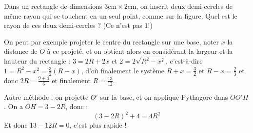
\begin{exo}
Dans un rectangle de dimensions $3\mathrm{cm}\times 2\mathrm{cm}$, on inscrit deux demi-cercles de même rayon qui se touchent en un seul point, comme sur la figure.
Quel est le rayon de ces deux demi-cercles ? (Ce n'est pas $1$!)
\begin{center}
\end{center}
\begin{sol}
On peut par exemple projeter le centre du rectangle sur une base, noter $x$ la distance de $O$ à ce projeté, et on obtient alors en considérant la largeur et la hauteur du rectangle :  $3=2R+2x$ et $2=2\sqrt{R^2-x^2}$, c'est-à-dire $1=R^2-x^2=\frac32(R-x)$, d'où finalement le système $R+x=\frac32$ et $R-x=\frac23$ et donc $2R=\frac{9+4}{6}$ et finalement $R=\frac{13}{12}$.

Autre méthode : on projette $O'$ sur la base, et on applique Pythagore dans $OO'H$. On a $OH=3-2R$, donc :
\[ (3-2R)^2+4=4R^2\]
Et donc $13-12R=0$, c'est plus rapide !
\end{sol}
\end{exo}



